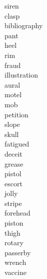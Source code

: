 \documentclass[b5paper, 11pt]{ctexart}
\begin{document}
\begin{multicols*}{3}
\begin{description}
\item[siren]

\item[clasp]

\item[bibliography]

\item[pant]

\item[heel]

\item[rim]

\item[fraud]

\item[illustration]

\item[aural]

\item[motel]

\item[mob]

\item[petition]

\item[slope]

\item[skull]

\item[fatigued]

\item[deceit]

\item[grease]

\item[pistol]

\item[escort]

\item[jolly]

\item[stripe]

\item[forehead]

\item[piston]

\item[thigh]

\item[rotary]

\item[passerby]

\item[wrench]

\item[vaccine]


\end{description}
\end{multicols*}
\end{document}

